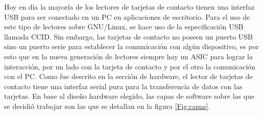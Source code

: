 \documentclass[%
        final,
        notitlepage,
        narroweqnarray,
        inline,
        ]{ieee}
\begin{document}




Hoy en día la mayoría de los lectores de tarjetas de contacto tienen una interfaz USB para ser conectado en un PC en aplicaciones de escritorio. Para el uso de este tipo de lectores sobre GNU/Linux, se hace uso de la especificación USB llamada CCID.
Sin embargo, las tarjetas de contacto no poseen un puerto USB sino un puerto serie para establecer la comunicación con algún dispositivo, es por esto que en la nueva generación de lectores siempre hay un ASIC para lograr la interacción, por un lado con la tarjeta de contacto y por el otro la comunicación con el PC.
Como fue descrito en la sección de hardware, el lector de tarjetas de contacto tiene una interfaz serial pura para la transferencia de datos con las tarjetas. En base al diseño hardware elegido, las capas de software sobre las que se decidió trabajar son las que se detallan en la figura \ref{Fig:capas}. 
\end{document}
